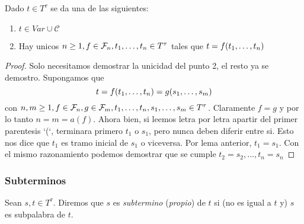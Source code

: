 \begin{theorem}
  Dado $t \in T^\tau$ se da una de las siguientes:
  \begin{enumerate}
    \item $t \in Var \cup \mathcal{C}$
    \item Hay unicos $n \geq 1, f \in \mathcal{F}_n, t_{1}, \dots, t_{n} \in T^\tau$ tales que $t = f(t_{1}, \dots, t_{n})$
  \end{enumerate}
\end{theorem}
\begin{proof}
  Solo necesitamos demostrar la unicidad del punto 2, el resto ya se demostro. Supongamos que
  $$
  t=f(t_{1}, \dots, t_{n})=g(s_{1}, \dots, s_{m})
  $$
  con $n,m\geq1,f\in\mathcal{F}_n,g\in\mathcal{F}_m,t_{1}, \dots, t_{n},s_{1}, \dots, s_{m}\in T^\tau$. Claramente $f=g$ y por lo tanto $n=m=a(f)$.
  Ahora bien, si leemos letra por letra apartir del primer parentesis `(`, terminara primero $t_1$ o $s_1$, pero nunca deben diferir entre si. Esto nos dice
  que $t_1$ es tramo inicial de $s_1$ o viceversa. Por lema anterior, $t_1=s_1$. Con el mismo razonamiento podemos demostrar que se cumple 
  $t_2=s_2,\dots,t_n=s_n$
\end{proof}

\subsubsection{Subterminos}

\begin{definition}
  Sean $s, t \in T^\tau$. Diremos que $s$ es \emph{subtermino} (\emph{propio}) de $t$ si (no es igual a $t$ y) $s$ es subpalabra de $t$.
\end{definition}

